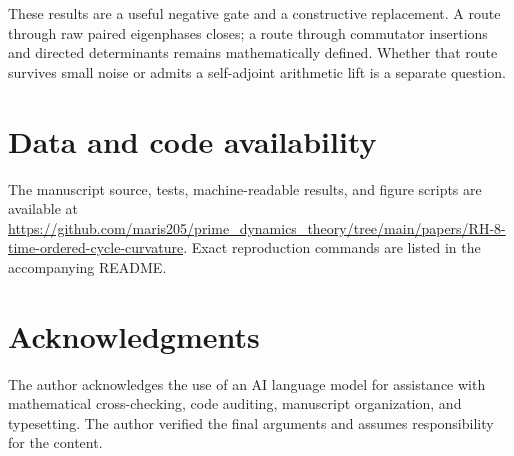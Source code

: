 \documentclass[11pt]{article}
\theoremstyle{definition}
\theoremstyle{remark}
\begin{document}
These results are a useful negative gate and a constructive replacement.  A
route through raw paired eigenphases closes; a route through commutator
insertions and directed determinants remains mathematically defined.  Whether
that route survives small noise or admits a self-adjoint arithmetic lift is a
separate question.

\section*{Data and code availability}

The manuscript source, tests, machine-readable results, and figure scripts are
available at
\url{https://github.com/maris205/prime_dynamics_theory/tree/main/papers/RH-8-time-ordered-cycle-curvature}.
Exact reproduction commands are listed in the accompanying README.

\section*{Acknowledgments}

The author acknowledges the use of an AI language model for assistance with
mathematical cross-checking, code auditing, manuscript organization, and
typesetting.  The author verified the final arguments and assumes
responsibility for the content.

{\small


}
\end{document}
